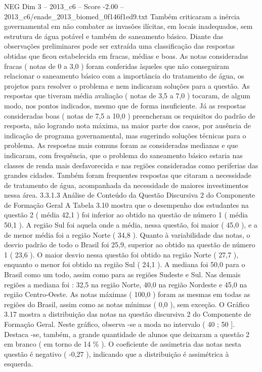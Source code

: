 \begin{textsample}{NEG Dim 3 – 2013\_c6 – Score -2.00 – 2013\_c6/enade\_2013\_biomed\_0f146f1ed9.txt}
Também criticaram a inércia governamental em não combater as invasões ilícitas, em locais inadequados, sem estrutura de água potável e também de saneamento básico.
Diante das observações preliminares pode ser extraída uma classificação das respostas obtidas que ficou estabelecida em fracas, médias e boas.
As notas consideradas fracas ( notas de 0 a 3,0 ) foram conferidas àqueles que não conseguiram relacionar o saneamento básico com a importância do tratamento de água, os projetos para resolver o problema e nem indicaram soluções para a questão.
As respostas que tiveram média avaliação ( notas de 3,5 a 7,0 ) tocaram, de algum modo, nos pontos indicados, mesmo que de forma insuficiente.
Já as respostas consideradas boas ( notas de 7,5 a 10,0 ) preencheram os requisitos do padrão de resposta, não logrando nota máxima, na maior parte dos casos, por ausência de indicação de programa governamental, mas sugerindo soluções técnicas para o problema.
As respostas mais comuns foram as consideradas medianas e que indicaram, com frequência, que o problema do saneamento básico estaria nas classes de renda mais desfavorecida e nas regiões consideradas como periferias das grandes cidades.
Também foram frequentes respostas que citaram a necessidade de tratamento de água, acompanhada da necessidade de maiores investimentos nessa área. 3.3.1.3 Análise de Conteúdo da Questão Discursiva 2 do Componente de Formação Geral A Tabela 3.10 mostra que o desempenho dos estudantes na questão 2 ( média 42,1 ) foi inferior ao obtido na questão de número 1 ( média 50,1 ).
A região Sul foi aquela onde a média, nessa questão, foi maior ( 45,0 ), e a de menor média foi a região Norte ( 34,8 ).
Quanto à variabilidade das notas, o desvio padrão de todo o Brasil foi 25,9, superior ao obtido na questão de número 1 ( 23,6 ).
O maior desvio nessa questão foi obtido na região Norte ( 27,7 ), enquanto o menor foi obtido na região Sul ( 24,1 ).
A mediana foi 50,0 para o Brasil como um todo, assim como para as regiões Sudeste e Sul.
Nas demais regiões a mediana foi : 32,5 na região Norte, 40,0 na região Nordeste e 45,0 na região Centro-Oeste.
As notas máximas ( 100,0 ) foram as mesmas em todas as regiões do Brasil, assim como as notas mínimas ( 0,0 ), sem exceção.
O Gráfico 3.17 mostra a distribuição das notas na questão discursiva 2 do Componente de Formação Geral.
Neste gráfico, observa -se a moda no intervalo ( 40 ; 50 ].
Destaca -se, também, a grande quantidade de alunos que deixaram a questão 2 em branco ( em torno de 14 \% ).
O coeficiente de assimetria das notas nesta questão é negativo ( -0,27 ), indicando que a distribuição é assimétrica à esquerda.

\end{textsample}
